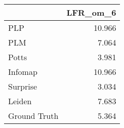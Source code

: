 \begin{tabular}{lr}
\toprule
{} & LFR_om_6 \\
\midrule
PLP          &   10.966 \\
PLM          &    7.064 \\
Potts        &    3.981 \\
Infomap      &   10.966 \\
Surprise     &    3.034 \\
Leiden       &    7.683 \\
Ground Truth &    5.364 \\
\bottomrule
\end{tabular}
